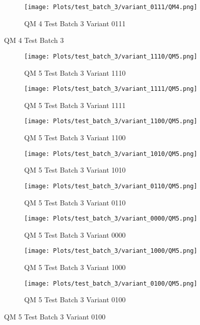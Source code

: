 \documentclass{DissertateFigs}
\begin{document}
\begin{figure}[t!]
\medskip

    \begin{subfigure}{0.47\textwidth}
    \texttt{[image: Plots/test\_batch\_3/variant\_0111/QM4.png]}
    \caption{QM 4 Test Batch 3 Variant 0111}
    \end{subfigure}
\caption{QM 4 Test Batch 3}
    \end{figure}
\clearpage
\begin{figure}[t!]
    \begin{subfigure}{0.47\textwidth}
    \texttt{[image: Plots/test\_batch\_3/variant\_1110/QM5.png]}
    \caption{QM 5 Test Batch 3 Variant 1110}
    \end{subfigure}
    \begin{subfigure}{0.47\textwidth}
    \texttt{[image: Plots/test\_batch\_3/variant\_1111/QM5.png]}
    \caption{QM 5 Test Batch 3 Variant 1111}
    \end{subfigure}

\medskip

    \begin{subfigure}{0.47\textwidth}
    \texttt{[image: Plots/test\_batch\_3/variant\_1100/QM5.png]}
    \caption{QM 5 Test Batch 3 Variant 1100}
    \end{subfigure}
    \begin{subfigure}{0.47\textwidth}
    \texttt{[image: Plots/test\_batch\_3/variant\_1010/QM5.png]}
    \caption{QM 5 Test Batch 3 Variant 1010}
    \end{subfigure}

\medskip

    \begin{subfigure}{0.47\textwidth}
    \texttt{[image: Plots/test\_batch\_3/variant\_0110/QM5.png]}
    \caption{QM 5 Test Batch 3 Variant 0110}
    \end{subfigure}
    \begin{subfigure}{0.47\textwidth}
    \texttt{[image: Plots/test\_batch\_3/variant\_0000/QM5.png]}
    \caption{QM 5 Test Batch 3 Variant 0000}
    \end{subfigure}

\medskip

    \begin{subfigure}{0.47\textwidth}
    \texttt{[image: Plots/test\_batch\_3/variant\_1000/QM5.png]}
    \caption{QM 5 Test Batch 3 Variant 1000}
    \end{subfigure}
    \begin{subfigure}{0.47\textwidth}
    \texttt{[image: Plots/test\_batch\_3/variant\_0100/QM5.png]}
    \caption{QM 5 Test Batch 3 Variant 0100}
    \end{subfigure}


\end{figure}
\end{document}
